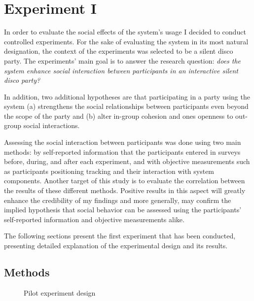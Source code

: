 \documentclass[a4paper,11pt]{article}
\begin{document}
{\section{Experiment I}

In order to evaluate the social effects of the system's usage I decided to conduct controlled experiments.
For the sake of evaluating the system in its most natural designation, the context of the experiments was selected to be a silent disco party.
The experiments' main goal is to answer the research question: \emph{does the system enhance social interaction between participants in an interactive silent disco party?}

In addition, two additional hypotheses are that participating in a party using the system (a) strengthens the social relationships between participants even beyond the scope of the party and (b) alter in-group cohesion and ones openness to out-group social interactions.

Assessing the social interaction between participants was done using two main methods: by self-reported information that the participants entered in surveys before, during, and after each experiment, and with objective measurements such as participants positioning tracking and their interaction with system components.
Another target of this study is to evaluate the correlation between the results of these different methods.
Positive results in this aspect will greatly enhance the credibility of my findings and more generally, may confirm the implied hypothesis that social behavior can be assessed using the participants' self-reported information and objective measurements alike.

The following sections present the first experiment that has been conducted, presenting detailed explanation of the experimental design and its results.

\subsection{Methods}

\begin{figure}[!htb]
	\centering
	\def\svgwidth{0.95\columnwidth}
  	
	\caption{Pilot experiment design}\label{fig:pilot}
\end{figure}

}
\end{document}
